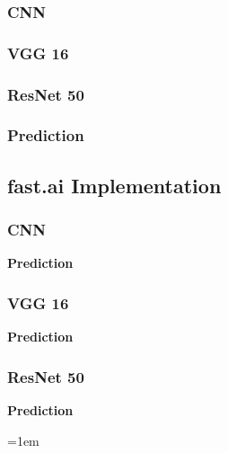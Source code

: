 \documentclass[11pt]{article}
\begin{document}
	\subsubsection{CNN}
	

	\subsubsection{VGG 16}
	

	\subsubsection{ResNet 50}
	

	\subsubsection{Prediction}
	

	\subsection{fast.ai Implementation}%
	\label{sub:fast.ai Implementation}

	\subsubsection{CNN}
	

	\textbf{Prediction}
	

	\subsubsection{VGG 16}
	

	\textbf{Prediction}
	

	\subsubsection{ResNet 50}
	

	\textbf{Prediction}
	

	\emergencystretch=1em
	\printbibliography[heading=bibintoc,title={References}]
\end{document}
